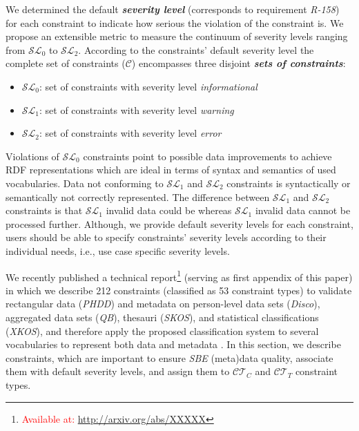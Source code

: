 \documentclass{llncs}
\begin{document}
We determined the default \textbf{\emph{severity level}} (corresponds to requirement \emph{R-158}) for each constraint to indicate how serious the violation of the constraint is.
We propose an extensible metric to measure the continuum of severity levels ranging from $\mathcal{SL}_{0}$ to $\mathcal{SL}_{2}$.
According to the constraints' default severity level the complete set of constraints ($\mathcal{C}$) encompasses three disjoint \textbf{\emph{sets of constraints}}:
\begin{itemize}
	\item $\mathcal{SL}_{0}$: set of constraints with severity level \emph{informational}
	\item $\mathcal{SL}_{1}$: set of constraints with severity level \emph{warning}
	\item $\mathcal{SL}_{2}$: set of constraints with severity level \emph{error}
\end{itemize}
Violations of $\mathcal{SL}_{0}$ constraints point to possible data improvements to achieve RDF representations which are ideal in terms of syntax and semantics of used vocabularies. 
Data not conforming to $\mathcal{SL}_{1}$ and $\mathcal{SL}_{2}$ constraints is syntactically or semantically not correctly represented.
The difference between $\mathcal{SL}_{1}$ and $\mathcal{SL}_{2}$ constraints is that $\mathcal{SL}_{1}$ invalid data could be
whereas $\mathcal{SL}_{1}$ invalid data cannot be processed further. 
Although, we provide default severity levels for each constraint, users should be able to specify constraints' severity levels according to their individual needs, i.e., use case specific severity levels.

We recently published a technical report\footnote{\textcolor{red}{\label{technical-report-1}Available at: \url{http://arxiv.org/abs/XXXXX}}} (serving as first appendix of this paper) in which we describe 212 constraints (classified as 53 constraint types) to validate rectangular data (\emph{PHDD}) and metadata on person-level data sets (\emph{Disco}), aggregated data sets (\emph{QB}), thesauri (\emph{SKOS}), and statistical classifications (\emph{XKOS}), and therefore apply the proposed classification system to several vocabularies to represent both data and metadata \cite{BoschZapilkoWackerowEckert2015}.
In this section, we describe constraints, which are important to ensure \emph{SBE} (meta)data quality, 
associate them with default severity levels, and assign them to $\mathcal{CT}_{C}$ and $\mathcal{CT}_{T}$ constraint types. 

%
%
%
\end{document}
